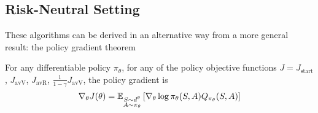 \subsection{Risk-Neutral Setting}
These algorithms can be derived in an alternative way from a more general result: the policy gradient theorem \cite{sutton1999policy} 
\begin{theorem}
	For any differentiable policy $\pi_\theta$, for any of the policy objective
	functions $J = J_{\text{start}}$, $J_{\text{avV}}$, $J_{\text{avR}}$,
	$\frac{1}{1-\gamma} J_{\text{avV}}$, the policy gradient is 
	\begin{equation}
		\nabla_\theta J(\theta) =
		\E[\substack{S \sim d^\theta\\A \sim \pi_\theta}]{\nabla_\theta\log
		\pi_\theta(S,A) Q_{\pi_\theta}(S, A)}
	\end{equation}
\end{theorem}
